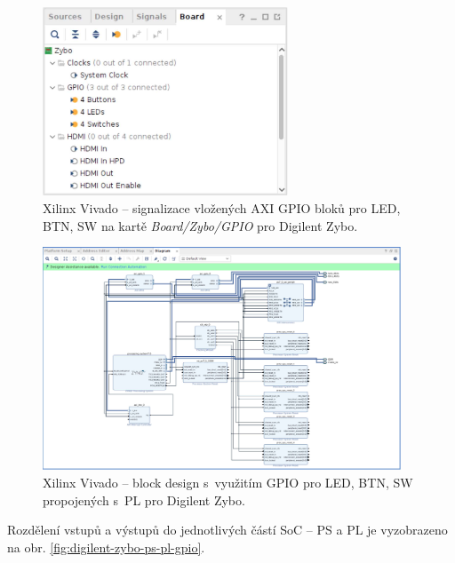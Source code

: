 \documentclass[a4paper, twoside, 11pt]{article}
\begin{document}
\begin{appendices}
		\begin{figure}[htbp!]
			\centering
			\includegraphics[width=0.65\textwidth]{src/png/zybo-xilinx-vivado-flow/zybo-xilinx-vivado-flow-38.jpg}
			\caption{Xilinx Vivado – signalizace vložených AXI GPIO bloků pro LED, BTN, SW na kartě \textit{Board/Zybo/GPIO} pro Digilent Zybo.}
			\label{fig:zybo-xilinx-vivado-flow-38}
		\end{figure}

		\begin{figure}[htbp!]
			\centering
			\includegraphics[width=0.95\textwidth]{src/png/zybo-xilinx-vivado-flow/zybo-xilinx-vivado-flow-37.jpg}
			\caption{Xilinx Vivado – block design s~využitím GPIO pro LED, BTN, SW propojených s~PL pro Digilent Zybo.}
			\label{fig:zybo-xilinx-vivado-flow-37}
		\end{figure}

		Rozdělení vstupů a výstupů do jednotlivých částí SoC – PS a PL je vyzobrazeno na obr. \ref{fig:digilent-zybo-ps-pl-gpio}.


\end{appendices}
\end{document}
